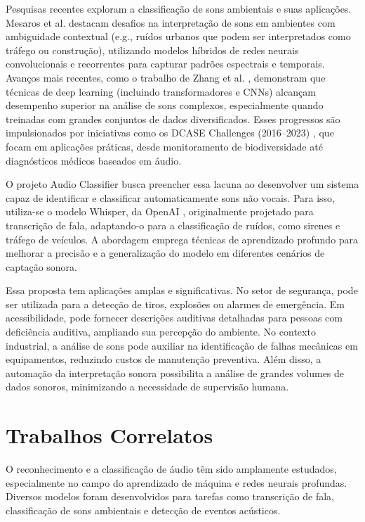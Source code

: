 \documentclass[conference]{IEEEtran}
\begin{document}
Pesquisas recentes exploram a classificação de sons ambientais e suas aplicações. Mesaros et al. \cite{b7} destacam desafios na interpretação de sons em ambientes com ambiguidade contextual (e.g., ruídos urbanos que podem ser interpretados como tráfego ou construção), utilizando modelos híbridos de redes neurais convolucionais e recorrentes para capturar padrões espectrais e temporais. Avanços mais recentes, como o trabalho de Zhang et al. \cite{b8}, demonstram que técnicas de deep learning (incluindo transformadores e CNNs) alcançam desempenho superior na análise de sons complexos, especialmente quando treinadas com grandes conjuntos de dados diversificados. Esses progressos são impulsionados por iniciativas como os DCASE Challenges (2016–2023) \cite{b9}, que focam em aplicações práticas, desde monitoramento de biodiversidade até diagnósticos médicos baseados em áudio.

O projeto Audio Classifier busca preencher essa lacuna ao desenvolver um sistema capaz de identificar e classificar automaticamente sons não vocais. Para isso, utiliza-se o modelo Whisper, da OpenAI \cite{b3}, originalmente projetado para transcrição de fala, adaptando-o para a classificação de ruídos, como sirenes e tráfego de veículos. A abordagem emprega técnicas de aprendizado profundo para melhorar a precisão e a generalização do modelo em diferentes cenários de captação sonora.

Essa proposta tem aplicações amplas e significativas. No setor de segurança, pode ser utilizada para a detecção de tiros, explosões ou alarmes de emergência. Em acessibilidade, pode fornecer descrições auditivas detalhadas para pessoas com deficiência auditiva, ampliando sua percepção do ambiente. No contexto industrial, a análise de sons pode auxiliar na identificação de falhas mecânicas em equipamentos, reduzindo custos de manutenção preventiva. Além disso, a automação da interpretação sonora possibilita a análise de grandes volumes de dados sonoros, minimizando a necessidade de supervisão humana.

\section{Trabalhos Correlatos}
O reconhecimento e a classificação de áudio têm sido amplamente estudados, especialmente no campo do aprendizado de máquina e redes neurais profundas. Diversos modelos foram desenvolvidos para tarefas como transcrição de fala, classificação de sons ambientais e detecção de eventos acústicos.
\end{document}
